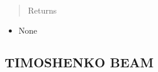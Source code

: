 \documentclass[letterpaper,10pt,english]{sphinxmanual}
\begin{document}
\begin{fulllineitems}
\begin{fulllineitems}
\begin{itemize}
\begin{description}
\end{description}

\end{itemize}
\begin{quote}\begin{description}
\item[{Returns}] \leavevmode
\end{description}\end{quote}
\begin{itemize}
\item {} 
None

\end{itemize}

\end{fulllineitems}


\end{fulllineitems}



\subsection{TIMOSHENKO BEAM}
\label{structures:timoshenko-beam}
\end{document}
